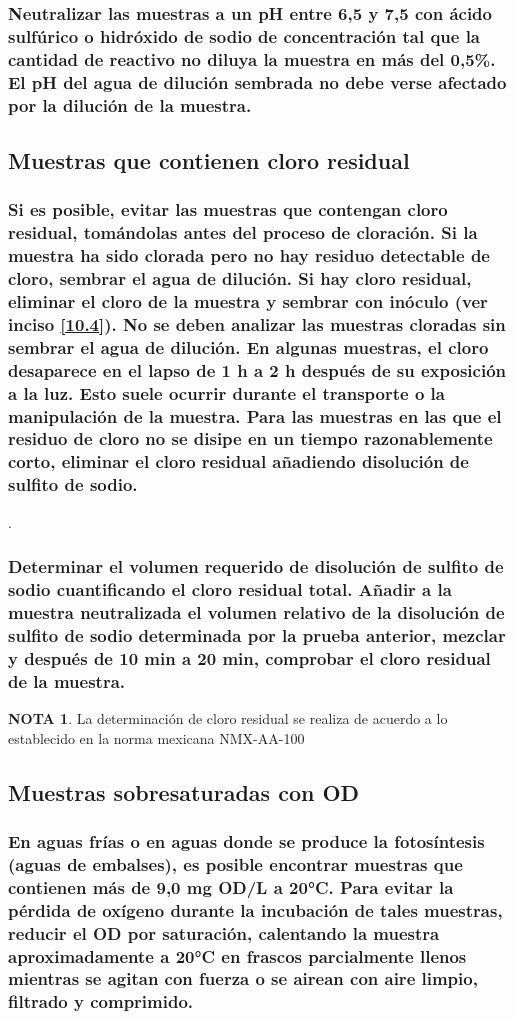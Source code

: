 \documentclass[spanish,12pt,letterpaper,titlepage]{article}
\theoremstyle{definition}
\newtheorem{teor}{NOTA}
\begin{document}
	\subsubsection{Neutralizar las muestras a un pH entre 6,5 y 7,5 con ácido sulfúrico o hidróxido de sodio de concentración tal que la cantidad de reactivo no diluya la muestra en más del 0,5\%. El pH del agua de dilución sembrada no debe verse afectado por la dilución de la muestra.}\label{10.6.1.1}
	\subsection{Muestras que contienen cloro residual}\label{10.6.2}
	\subsubsection{Si es posible, evitar las muestras que contengan cloro residual, tomándolas antes del proceso de cloración. Si la muestra ha sido clorada pero no hay residuo detectable de cloro, sembrar el agua de dilución. Si hay cloro residual, eliminar el cloro de la muestra y sembrar con inóculo (ver inciso \ref{10.4}). No se deben analizar las muestras cloradas sin sembrar el agua de dilución. En algunas muestras, el cloro desaparece en el lapso de 1 h a 2 h después de su exposición a la luz. Esto suele ocurrir durante el transporte o la manipulación de la muestra. Para las muestras en las que el residuo de cloro no se disipe en un tiempo razonablemente corto, eliminar el cloro residual añadiendo disolución de sulfito de sodio.}\label{10.6.2.1}.
	\subsubsection{Determinar el volumen requerido de disolución de sulfito de sodio cuantificando el cloro residual total. Añadir a la muestra neutralizada el volumen relativo de la disolución de sulfito de sodio determinada por la prueba anterior, mezclar y después de 10 min a 20 min, comprobar el cloro residual de la muestra.}\label{10.6.2.2}
	\begin{teor}
		La determinación de cloro residual se realiza de acuerdo a lo establecido en la norma mexicana NMX-AA-100
	\end{teor}
	\subsection{Muestras sobresaturadas con OD}\label{10.6.3}
	\subsubsection{En aguas frías o en aguas donde se produce la fotosíntesis (aguas de embalses), es posible encontrar muestras que contienen más de 9,0 mg OD/L a 20°C. Para evitar la pérdida de oxígeno durante la incubación de tales muestras, reducir el OD por saturación, calentando la muestra aproximadamente a 20°C en frascos parcialmente llenos mientras se agitan con fuerza o se airean con aire limpio, filtrado y comprimido.}\label{10.6.3.1}
\end{document}
